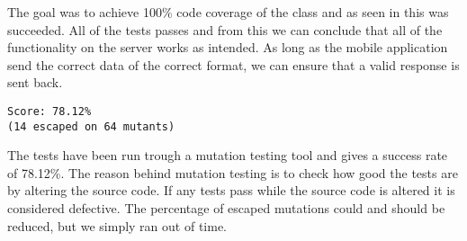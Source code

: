 The goal was to achieve 100\% code coverage of the  class and as seen in  this was succeeded. All of the tests passes and from this we can conclude that all of the functionality on the server works as intended. As long as the mobile application send the correct data of the correct format, we can ensure that a valid response is sent back.

\begin{lstlisting}[numbers=none, basicstyle=\ttfamily, caption={The result of the Mutagenesis test}]
Score: 78.12%
(14 escaped on 64 mutants)
\end{lstlisting}

The tests have been run trough a mutation testing tool and gives a success rate of 78.12\%. The reason behind mutation testing is to check how good the tests are by altering the source code. If any tests pass while the source code is altered it is considered defective. The percentage of escaped mutations could and should be reduced, but we simply ran out of time.


